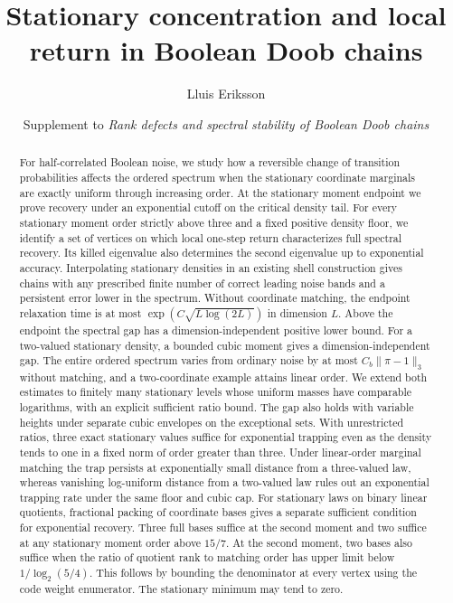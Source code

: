 \documentclass[11pt]{article}
\title{Stationary concentration and local return in Boolean Doob chains}
\author{Lluis Eriksson}
\date{Supplement to \emph{Rank defects and spectral stability of Boolean Doob chains}}
\begin{document}
\maketitle
\begin{abstract}
For half-correlated Boolean noise, we study how a reversible change of
transition probabilities affects the ordered spectrum when the stationary
coordinate marginals are exactly uniform through increasing order.
At the stationary moment endpoint we prove recovery under an exponential
cutoff on the critical density tail. For every stationary moment order
strictly above three and a fixed positive density floor, we identify a set
of vertices on which local one-step return characterizes full spectral
recovery. Its killed eigenvalue also determines the second eigenvalue up to
exponential accuracy. Interpolating stationary densities in an existing
shell construction gives chains with any prescribed finite number of correct
leading noise bands and a persistent error lower in the spectrum.
Without coordinate matching, the endpoint relaxation time is at most $\exp(C\sqrt{L\log(2L)})$ in dimension $L$. Above the endpoint the spectral gap has a dimension-independent positive lower bound.
For a two-valued stationary density, a bounded cubic moment gives a dimension-independent gap. The entire ordered spectrum varies from ordinary noise by at most $C_b\|\pi-1\|_3$ without matching, and a two-coordinate example attains linear order. We extend both estimates to finitely many stationary levels whose uniform masses have comparable logarithms, with an explicit sufficient ratio bound. The gap also holds with variable heights under separate cubic envelopes on the exceptional sets.
With unrestricted ratios, three exact stationary values suffice for exponential trapping even as the density tends to one in a fixed norm of order greater than three. Under linear-order marginal matching the trap persists at exponentially small distance from a three-valued law, whereas vanishing log-uniform distance from a two-valued law rules out an exponential trapping rate under the same floor and cubic cap.
For stationary laws on binary linear quotients, fractional packing of coordinate bases gives a separate sufficient condition for exponential recovery. Three full bases suffice at the second moment and two suffice at any stationary moment order above $15/7$. At the second moment, two bases also suffice when the ratio of quotient rank to matching order has upper limit below $1/\log_2(5/4)$. This follows by bounding the denominator at every vertex using the code weight enumerator. The stationary minimum may tend to zero.
\end{abstract}
\end{document}
